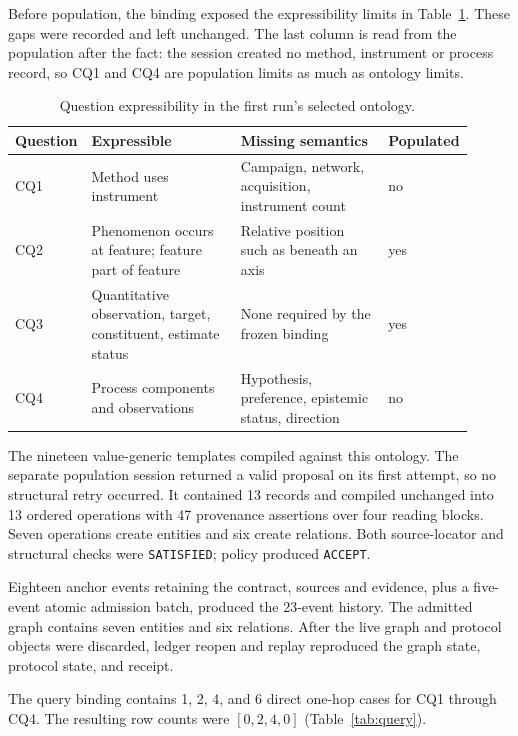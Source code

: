 \documentclass[10pt]{article}
\newcommand{\code}[1]{\texttt{#1}}
\begin{document}
Before population, the binding exposed the expressibility limits in Table~\ref{tab:expressibility}. These gaps were recorded and left unchanged. The last column is read from the population after the fact: the session created no method, instrument or process record, so CQ1 and CQ4 are population limits as much as ontology limits.

\begin{table}[h!]
\centering
\caption{Question expressibility in the first run's selected ontology.}
\label{tab:expressibility}
\small
\begin{tabular}{@{}p{0.09\linewidth}p{0.36\linewidth}p{0.36\linewidth}p{0.1\linewidth}@{}}
\toprule
Question & Expressible & Missing semantics & Populated \\
\midrule
CQ1 & Method uses instrument & Campaign, network, acquisition, instrument count & no \\
CQ2 & Phenomenon occurs at feature; feature part of feature & Relative position such as beneath an axis & yes \\
CQ3 & Quantitative observation, target, constituent, estimate status & None required by the frozen binding & yes \\
CQ4 & Process components and observations & Hypothesis, preference, epistemic status, direction & no \\
\bottomrule
\end{tabular}
\end{table}

The nineteen value-generic templates compiled against this ontology. The separate population session returned a valid proposal on its first attempt, so no structural retry occurred. It contained 13 records and compiled unchanged into 13 ordered operations with 47 provenance assertions over four reading blocks. Seven operations create entities and six create relations. Both source-locator and structural checks were \code{SATISFIED}; policy produced \code{ACCEPT}.

Eighteen anchor events retaining the contract, sources and evidence, plus a five-event atomic admission batch, produced the 23-event history. The admitted graph contains seven entities and six relations. After the live graph and protocol objects were discarded, ledger reopen and replay reproduced the graph state, protocol state, and receipt.

The query binding contains 1, 2, 4, and 6 direct one-hop cases for CQ1 through CQ4. The resulting row counts were $[0,2,4,0]$ (Table~\ref{tab:query}).
\end{document}
